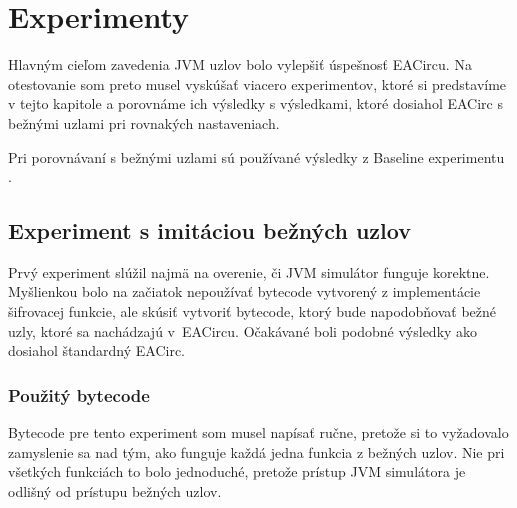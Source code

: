 \chapter{Experimenty}
\label{chap:experiments}

Hlavným cieľom zavedenia JVM uzlov bolo vylepšiť úspešnosť EACircu. Na otestovanie som preto musel vyskúšať viacero experimentov, ktoré si predstavíme v tejto kapitole a porovnáme ich výsledky s výsledkami, ktoré dosiahol EACirc s bežnými uzlami pri rovnakých nastaveniach. 

Pri porovnávaní s bežnými uzlami sú používané výsledky z Baseline experimentu \cite{baseline-experiment}. 

\section{Experiment s imitáciou bežných uzlov}
\label{sec:exp1}

Prvý experiment slúžil najmä na overenie, či JVM simulátor funguje korektne. Myšlienkou bolo na začiatok nepoužívať bytecode vytvorený z implementácie šifrovacej funkcie, ale skúsiť vytvoriť bytecode, ktorý bude napodobňovať bežné uzly, ktoré sa nachádzajú v~EACircu. Očakávané boli podobné výsledky ako dosiahol štandardný EACirc.

\subsection{Použitý bytecode}
\label{subsec:exp1-bytecode}

Bytecode pre tento experiment som musel napísať ručne, pretože si to vyžadovalo zamyslenie sa nad tým, ako funguje každá jedna funkcia z bežných uzlov. Nie pri všetkých funkciách to bolo jednoduché, pretože prístup JVM simulátora je odlišný od prístupu bežných uzlov. 

